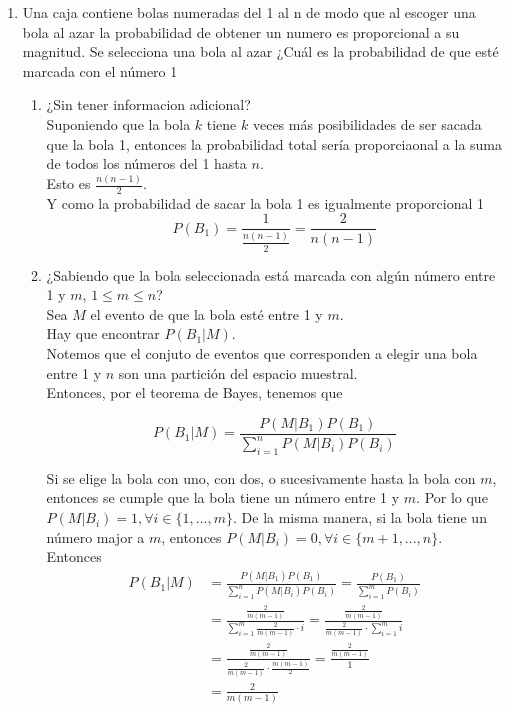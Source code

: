 \documentclass[12pt,a4paper]{report}
\begin{document}
\begin{enumerate}
  \item{
 Una caja contiene bolas numeradas del 1 al n de modo que al escoger una bola al azar la probabilidad de obtener un numero es proporcional a su magnitud. Se selecciona una bola al azar ¿Cuál es la probabilidad de que esté marcada con el número 1\\
 \begin{enumerate}[label= \alph*) ]
 \item{
	 	¿Sin tener informacion adicional?\\
		Suponiendo que la bola $k$ tiene $k$ veces más posibilidades de ser sacada que la bola 1,
		entonces la probabilidad total sería proporciaonal a la suma de todos los números del 1 hasta $n$.\\
		Esto es $\frac{n(n-1)}{2}$.\\
		Y como la probabilidad de sacar la bola 1 es igualmente  proporcional 1
		\begin{equation*}
			P(B_1) = \frac{1}{\frac{n(n-1)}{2}} = \frac{2}{n(n-1)}
		\end{equation*}
	}
 \item{
	 	¿Sabiendo que la bola seleccionada está marcada con algún número entre 1 y $m$, $1\leq m \leq n$?\\
		Sea $M$ el evento de que la bola esté entre 1 y $m$.\\
		Hay que encontrar $P(B_1|M)$.\\
		Notemos que el conjuto de eventos que corresponden a elegir una bola entre 1 y $n$
		son una partición del espacio muestral.\\
		Entonces, por el teorema de Bayes, tenemos que

			\[P(B_1|M) = \frac{P(M | B_1)P(B_1)}{\sum_{i = 1}^n P(M|B_i)P(B_i)}\]

		Si se elige la bola con uno, con dos, o sucesivamente hasta la bola con $m$,
		entonces se cumple que la bola tiene un número entre 1 y $m$. Por lo que
		$P(M|B_i) = 1, \forall i \in \{1, ..., m\}$. De la misma manera, si la bola
		tiene un número major a $m$, entonces $P(M|B_i) = 0, \forall i \in \{m+1, ..., n\}$.\\
		Entonces
		\begin{align*}
			P(B_1|M) &= \frac{P(M | B_1)P(B_1)}{\sum_{i = 1}^n P(M|B_i)P(B_i)}
							 = \frac{P(B_1)}{\sum_{i = 1}^m P(B_i)}\\
							 &= \frac{\frac{2}{m(m-1)}}{\sum_{i = 1}^m \frac{2}{m(m-1)}\cdot i}
							 = \frac{\frac{2}{m(m-1)}}{\frac{2}{m(m-1)} \cdot \sum_{i = 1}^m i}\\
							 &= \frac{\frac{2}{m(m-1)}}{\frac{2}{m(m-1)} \cdot \frac{m(m-1)}{2}}
							 = \frac{\frac{2}{m(m-1)}}{1}\\
							 &= \frac{2}{m(m-1)}
		\end{align*}
	}
 \end{enumerate}
  }


\end{enumerate}
\end{document}

